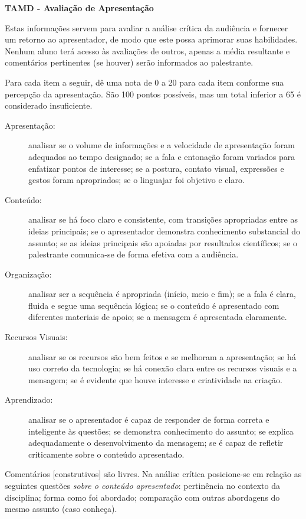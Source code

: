 \documentclass{UnBExam}%
\begin{document}
    \begin{center}%
    	\textbf{TAMD - Avaliação de Apresentação}%
    \end{center}%

    Estas informações servem para avaliar a análise crítica da audiência e fornecer
    um retorno ao apresentador, de modo que este possa aprimorar suas habilidades.
    Nenhum aluno terá acesso às avaliações de outros, apenas a média resultante e
    comentários pertinentes (se houver) serão informados ao palestrante.%

    Para cada item a seguir, dê uma nota de 0 a 20 para cada item conforme sua
    percepção da apresentação. São 100 pontos possíveis, mas um total inferior a
    65 é considerado insuficiente.%

	\begin{description}%
		\item[Apresentação:] analisar se o volume de informações e a velocidade
		de apresentação foram adequados ao tempo designado; se a fala e entonação 
		foram variados para enfatizar pontos de interesse; se a postura, contato
		visual, expressões e gestos foram apropriados; se o linguajar foi
		objetivo e claro.
		\item[Conteúdo:] analisar se há foco claro e consistente, com transições
		apropriadas entre as ideias principais; se o apresentador demonstra
		conhecimento substancial do assunto; se as ideias principais são apoiadas
		por resultados científicos; se o palestrante comunica-se de forma efetiva
		com a audiência.
		\item[Organização:] analisar ser a sequência é apropriada (início, meio
		e fim); se a fala é clara, fluida e segue uma sequência lógica; se o
		conteúdo é apresentado com diferentes materiais de apoio; se a mensagem
		é apresentada claramente.
		\item[Recursos Visuais:] analisar se os recursos são bem feitos e se
		melhoram a apresentação; se há uso correto da tecnologia; se há conexão
		clara entre os recursos visuais e a mensagem; se é evidente que houve
		interesse e criatividade na criação.
		\item[Aprendizado:] analisar se o apresentador é capaz de responder de
		forma correta e inteligente às questões; se demonstra conhecimento do
		assunto; se explica adequadamente o desenvolvimento da mensagem; se
		é capaz de refletir criticamente sobre o conteúdo apresentado.
	\end{description}%
	Comentários [construtivos] são livres. Na análise crítica posicione-se em
	relação as seguintes questões \emph{sobre o conteúdo apresentado}:
	pertinência no contexto da disciplina; forma como foi abordado; comparação
	com outras abordagens do mesmo assunto (caso conheça).
\end{document}
